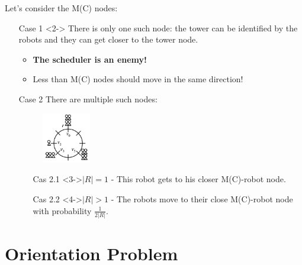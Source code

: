 \documentclass{beamer}
\begin{document}
\begin{frame}

	Let's consider the M(C) nodes:
	\begin{itemize}
		\item[Case 1]<2-> There is only one such node: the tower can be identified by the robots and they can get closer to the tower node.
		\begin{itemize}
			\item<3-> \textbf{The scheduler is an enemy!}
			\item<3-> Less than M(C) nodes should move in the same direction! 
		\end{itemize}
	\end{itemize}

\end{frame}

\begin{frame}
	\begin{itemize}
		\item[Case 2] There are multiple such nodes:
			\begin{figure}[h]
   				\includegraphics[width=0.2\textwidth]{images/random_configuration.png}
			\end{figure}
			\begin{itemize}
				\item[Cas 2.1]<3->$|R| = 1$ - This robot gets to his closer M(C)-robot node. 
				\item[Cas 2.2]<4->$|R| > 1$ - The robots move to their close M(C)-robot node with probability $\frac{1}{2|R|}$.
			\end{itemize}
	\end{itemize}
\end{frame}





\section{Orientation Problem}
\begin{frame}
\end{frame}
\end{document}
